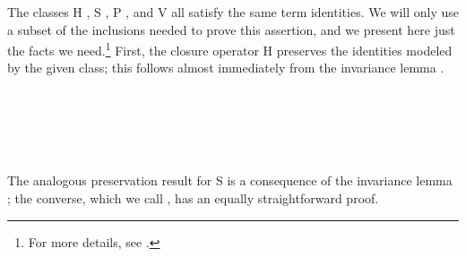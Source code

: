The classes \af H , \af S , \af P , and \af V  all satisfy the
same term identities.  We will only use a subset of the inclusions needed to prove this
assertion, and we present here just the facts we need.\footnote{For more details, see
.}
First, the closure operator \af H preserves the identities modeled by the
given class; this follows almost immediately from the invariance lemma
.

\begin{code}%
\>[0]\<%
\\
\>[0]\AgdaSpace{}%
\AgdaModule{\AgdaUnderscore{}}%
\>[10]\AgdaSymbol{\{}\AgdaSpace{}%
\AgdaSymbol{:}\AgdaSpace{}%
\AgdaSpace{}%
\AgdaSymbol{\}\{}\AgdaSpace{}%
\AgdaSymbol{:}\AgdaSpace{}%
\AgdaSymbol{(}\AgdaSpace{}%
\AgdaSpace{}%
\AgdaSymbol{)}\AgdaSpace{}%
\AgdaSymbol{(}\AgdaSpace{}%
\AgdaSpace{}%
\AgdaSpace{}%
\AgdaSpace{}%
\AgdaSpace{}%
\AgdaSymbol{)\}\{}\AgdaSpace{}%
\AgdaSpace{}%
\AgdaSymbol{:}\AgdaSpace{}%
\AgdaSpace{}%
\AgdaSymbol{\}}\AgdaSpace{}%
\<%
\\
\>[0][@{}l@{\AgdaIndent{0}}]%
\>[1]\AgdaSpace{}%
\AgdaSymbol{:}\AgdaSpace{}%
\AgdaSpace{}%
\AgdaSpace{}%
\AgdaSpace{}%
\AgdaSpace{}%
\AgdaSpace{}%
\AgdaSpace{}%
\AgdaSymbol{\{}\AgdaSpace{}%
\AgdaSymbol{=}\AgdaSpace{}%
\AgdaSymbol{\}\{}\AgdaSymbol{\}}\AgdaSpace{}%
\AgdaSpace{}%
\AgdaSpace{}%
\AgdaSpace{}%
\AgdaSpace{}%
\<%
\\
%
\>[1]\AgdaSpace{}%
\AgdaSpace{}%
\AgdaSpace{}%
\AgdaSymbol{(}\AgdaSpace{}%
\AgdaOperator{\AgdaInductiveConstructor{,}}\AgdaSpace{}%
\AgdaSpace{}%
\AgdaOperator{\AgdaInductiveConstructor{,}}\AgdaSpace{}%
\AgdaSymbol{)}\AgdaSpace{}%
\AgdaSymbol{=}\AgdaSpace{}%
\AgdaSymbol{\{}\AgdaSpace{}%
\AgdaSymbol{=}\AgdaSpace{}%
\AgdaSymbol{\}\{}\AgdaSymbol{\}}\AgdaSpace{}%
\AgdaSymbol{(}\AgdaSpace{}%
\AgdaSpace{}%
\AgdaSymbol{)}\AgdaSpace{}%
\<%
\\
\>[0]\<%
\end{code}
The analogous preservation result for \af S is a consequence of
the invariance lemma ; the converse, which we call
, has an equally straightforward proof.

